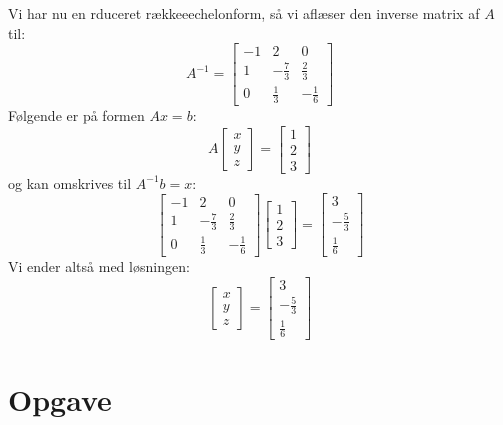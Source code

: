 \documentclass[a4paper,12pt]{article}
\begin{document}
Vi har nu en rduceret rækkeeechelonform, så vi aflæser den inverse matrix af $A$ til:\\
\[
A^{-1}=
\left[\begin{array}{ccc}
    -1 & 2 & 0 \\
    1 & -\frac{7}{3} & \frac{2}{3} \\
    0 & \frac{1}{3} & -\frac{1}{6}
\end{array}\right]
\]
Følgende er på formen $Ax = b$:\\
\[
A
\left[\begin{array}{c}
    x\\
    y\\
    z
\end{array}\right]
=
\left[\begin{array}{ccc}
    1\\
    2\\
    3
\end{array}\right]
\]
og kan omskrives til $A^{-1}b = x$:\\
\[
\left[\begin{array}{ccc}
    -1 & 2 & 0 \\
    1 & -\frac{7}{3} & \frac{2}{3} \\
    0 & \frac{1}{3} & -\frac{1}{6}
\end{array}\right]
\left[\begin{array}{c}
    1\\
    2\\
    3
\end{array}\right]
=
\left[\begin{array}{ccc}
    3\\
    -\frac{5}{3}\\
    \frac{1}{6}
\end{array}\right]
\]
Vi ender altså med løsningen:\\
\[
\left[\begin{array}{c}
    x\\
    y\\
    z
\end{array}\right]
=
\left[\begin{array}{ccc}
    3\\
    -\frac{5}{3}\\
    \frac{1}{6}
\end{array}\right]
\]

\section[Opgave]{Opgave}
\end{document}
